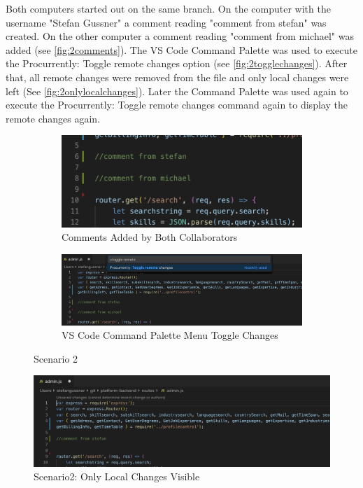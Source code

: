 Both computers started out on the same branch. On the computer with the username "Stefan Gussner" a comment reading "comment from stefan" was created. On the other computer a comment reading "comment from michael" was added (see \autoref{fig:2comments}). The VS Code Command Palette was used to execute the Procurrently: Toggle remote changes option (see \autoref{fig:2togglechanges}). After that, all remote changes were removed from the file and only local changes were left (See \autoref{fig:2onlylocalchanges}). Later the Command Palette was used again to execute the Procurrently: Toggle remote changes command again to display the remote changes again.

\begin{figure}[h]
    \begin{subfigure}{.5\textwidth}
        \centering
        \includegraphics[width=1\textwidth]{figures/screenshots/scenarios/2comments.png}
        \caption{Comments Added by Both Collaborators}
        \label{fig:2comments}
    \end{subfigure}
    \begin{subfigure}{.5\textwidth}
        \centering
        \includegraphics[width=1\linewidth]{figures/screenshots/scenarios/2togglechanges.png}
        \caption{VS Code Command Palette Menu Toggle Changes}
        \label{fig:2togglechanges}
    \end{subfigure}
    \caption{Scenario 2}
\end{figure}

\begin{figure}[hb]
    \centering
    \includegraphics[width=1\textwidth]{figures/screenshots/scenarios/2onlylocalchanges.png}
	\caption{Scenario2: Only Local Changes Visible}
    \label{fig:2onlylocalchanges}
\end{figure}

